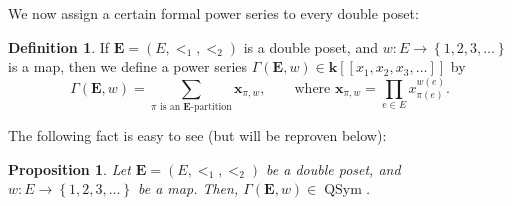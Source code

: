 \documentclass[12pt]{article}
\theoremstyle{plain}
\newtheorem{proposition}[theorem]{Proposition}
\theoremstyle{definition}
\newtheorem{definition}[theorem]{Definition}
\theoremstyle{remark}
\let\sumnonlimits\sum
\let\prodnonlimits\prod
\renewcommand{\sum}{\sumnonlimits\limits}
\renewcommand{\prod}{\prodnonlimits\limits}
\newcommand{\xx}{{\mathbf{x}}}
\newcommand{\QSym}{{\operatorname{QSym}}}
\newcommand{\Powser}{\mathbf{k}\left[\left[x_1,x_2,x_3,\ldots\right]\right]}
\newcommand{\EE}{{\mathbf{E}}}
\begin{document}

We now assign a certain formal power series to every double poset:

\begin{definition}
\label{def.Gammaw}
If $\EE = \left(E, <_1, <_2\right)$ is a double poset, and
$w : E \to \left\{1, 2, 3, \ldots\right\}$ is a map, then we define
a power series $\Gamma\left(\EE , w\right) \in \Powser$ by
\[
\Gamma\left(\EE , w\right)
= \sum_{\pi\text{ is an }\EE\text{-partition}}
  \xx_{\pi, w} ,
\qquad
\text{where } \xx_{\pi, w}
= \prod_{e \in E} x_{\pi\left(e\right)}^{w\left(e\right)} .
\]
\end{definition}

The following fact is easy to see (but will be reproven below):

\begin{proposition}
\label{prop.Gammaw.qsym}
Let $\EE = \left(E, <_1, <_2\right)$ be a double poset, and
$w : E \to \left\{1, 2, 3, \ldots\right\}$ be a map. Then,
$\Gamma\left(\EE , w\right) \in \QSym$.
\end{proposition}
\end{document}
